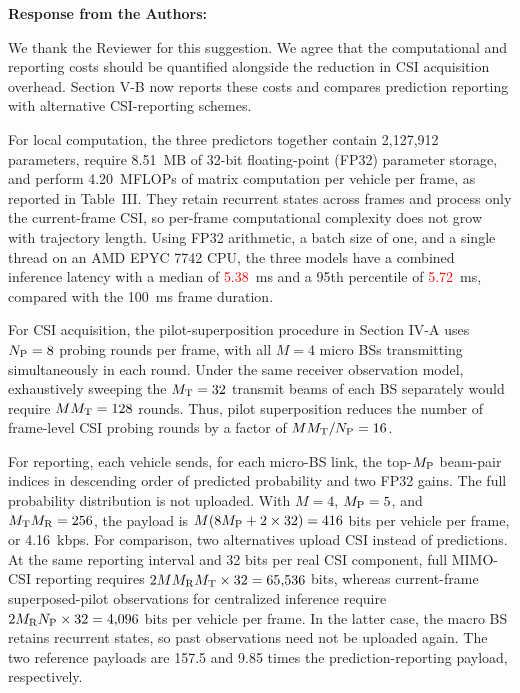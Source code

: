 \documentclass[11pt]{article}
\newenvironment{reviewedit}[1]
{\colorlet{responseblue}{#1}\colorlet{changeblue}{#1}\color{#1}}
{}
\newenvironment{authorresponse}
{\par\noindent\textcolor{responseblue}{\textbf{Response from the Authors:}}\par\color{responseblue}}
{\par}
\begin{document}
\begin{reviewedit}{blue}
\begin{authorresponse}
We thank the Reviewer for this suggestion. We agree that the computational
and reporting costs should be quantified alongside the reduction in CSI
acquisition overhead. Section V-B now reports these costs and compares prediction
reporting with alternative CSI-reporting schemes.

For local computation, the three predictors together contain 2,127,912
parameters, require 8.51~MB of 32-bit floating-point (FP32) parameter storage,
and perform 4.20~MFLOPs of matrix computation per vehicle per frame, as
reported in Table~III. They retain recurrent states across frames and process
only the current-frame CSI, so per-frame computational complexity does not grow with
trajectory length. Using FP32 arithmetic, a batch size of one, and a single
thread on an AMD EPYC 7742 CPU, the three models have a combined inference
latency with a median of \textcolor{red}{5.38}~ms and a 95th percentile of \textcolor{red}{5.72}~ms, compared
with the 100~ms frame duration.

For CSI acquisition, the pilot-superposition procedure in Section IV-A
uses $N_{\rm P}=8$ probing rounds per frame, with all $M=4$ micro BSs
transmitting simultaneously in each round. Under the same receiver
observation model, exhaustively sweeping the $M_{\rm T}=32$ transmit beams
of each BS separately would require $MM_{\rm T}=128$ rounds.
Thus, pilot superposition reduces the number of frame-level CSI probing
rounds by a factor of $MM_{\rm T}/N_{\rm P}=16$.

For reporting, each vehicle sends, for each micro-BS link, the top-$M_{\rm P}$ beam-pair
indices in descending order of predicted probability and two FP32 gains. 
The full probability distribution is not uploaded. With $M=4$, $M_{\rm P}=5$, and
$M_{\rm T}M_{\rm R}=256$, the payload is
$M(8M_{\rm P}+2\times32)=416$ bits per vehicle per frame, or 4.16~kbps.
For comparison, two alternatives upload CSI instead of predictions.
At the same reporting interval and 32 bits per real CSI component,
full MIMO-CSI reporting requires $2MM_{\rm R}M_{\rm T}\times32=65{,}536$
bits, whereas current-frame superposed-pilot observations for centralized
inference require $2M_{\rm R}N_{\rm P}\times32=4{,}096$ bits per vehicle
per frame. In the latter case, the macro BS retains recurrent states, so
past observations need not be uploaded again. The two reference payloads
are 157.5 and 9.85 times the prediction-reporting payload, respectively.


\end{authorresponse}
\end{reviewedit}
\end{document}
